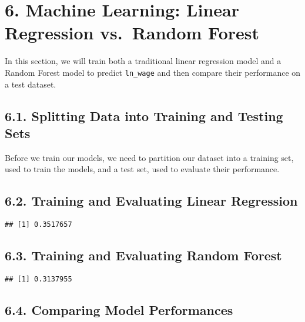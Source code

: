 \documentclass[
]{article}
\begin{document}
\hypertarget{machine-learning-linear-regression-vs.-random-forest}{%
\section{6. Machine Learning: Linear Regression vs.~Random
Forest}\label{machine-learning-linear-regression-vs.-random-forest}}

In this section, we will train both a traditional linear regression
model and a Random Forest model to predict \texttt{ln\_wage} and then
compare their performance on a test dataset.

\hypertarget{splitting-data-into-training-and-testing-sets}{%
\subsection{6.1. Splitting Data into Training and Testing
Sets}\label{splitting-data-into-training-and-testing-sets}}

Before we train our models, we need to partition our dataset into a
training set, used to train the models, and a test set, used to evaluate
their performance.

\hypertarget{training-and-evaluating-linear-regression}{%
\subsection{6.2. Training and Evaluating Linear
Regression}\label{training-and-evaluating-linear-regression}}

\begin{verbatim}
## [1] 0.3517657
\end{verbatim}

\hypertarget{training-and-evaluating-random-forest}{%
\subsection{6.3. Training and Evaluating Random
Forest}\label{training-and-evaluating-random-forest}}

\begin{verbatim}
## [1] 0.3137955
\end{verbatim}

\hypertarget{comparing-model-performances}{%
\subsection{6.4. Comparing Model
Performances}\label{comparing-model-performances}}
\end{document}
